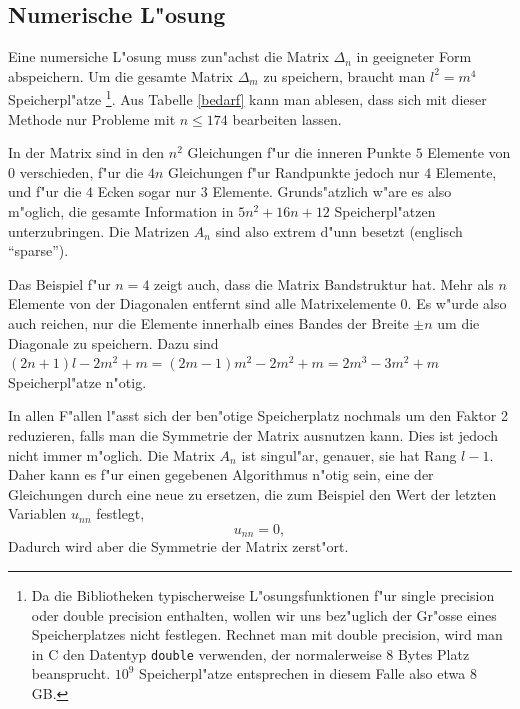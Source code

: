 \subsection{Numerische L"osung}
Eine numersiche L"osung
muss zun"achst die Matrix $\Delta_n$ in geeigneter Form abspeichern.
Um die gesamte Matrix $\Delta_m$ zu speichern, braucht man $l^2=m^4$
Speicherpl"atze%
\footnote{Da die Bibliotheken typischerweise
L"osungsfunktionen f"ur single precision oder double precision
enthalten, wollen wir uns bez"uglich der Gr"osse eines Speicherplatzes
nicht festlegen. Rechnet man mit double precision, wird man in C
den Datentyp {\tt double} verwenden, der normalerweise 8 Bytes Platz
beansprucht. $10^9$ Speicherpl"atze entsprechen in diesem Falle also
etwa 8 GB.}.  Aus Tabelle \ref{bedarf} kann man ablesen, dass sich mit
dieser Methode nur Probleme mit $n\le 174$ bearbeiten lassen.

In der Matrix sind in den $n^2$ Gleichungen f"ur die inneren Punkte
$5$ Elemente von $0$ verschieden, f"ur die $4n$ Gleichungen f"ur
Randpunkte jedoch nur $4$ Elemente, und f"ur die $4$ Ecken sogar nur $3$
Elemente. Grunds"atzlich w"are es also m"oglich, die gesamte Information
in $ 5n^2+16n+12$ Speicherpl"atzen unterzubringen.  Die Matrizen $A_n$
sind also extrem d"unn besetzt (englisch ``sparse'').

Das Beispiel f"ur $n=4$ zeigt auch, dass die Matrix Bandstruktur hat. Mehr
als $n$ Elemente von der Diagonalen entfernt sind alle Matrixelemente
$0$. Es w"urde also auch reichen, nur die Elemente innerhalb eines Bandes
der Breite $\pm n$ um die Diagonale zu speichern.  Dazu sind $(2n+1)l -
2m^2+m=(2m-1)m^2-2m^2+m=2m^3-3m^2+m$ Speicherpl"atze n"otig.

In allen F"allen l"asst sich der ben"otige Speicherplatz nochmals um
den Faktor 2 reduzieren, falls man die Symmetrie der Matrix ausnutzen
kann. Dies ist jedoch nicht immer m"oglich. Die Matrix $A_n$ ist
singul"ar, genauer, sie hat Rang $l-1$.  Daher kann es f"ur einen
gegebenen Algorithmus n"otig sein, eine der Gleichungen durch eine neue
zu ersetzen, die zum Beispiel den Wert der letzten Variablen $u_{nn}$
festlegt,
\[
u_{nn}=0,
\]
Dadurch wird aber die Symmetrie der Matrix zerst"ort.

